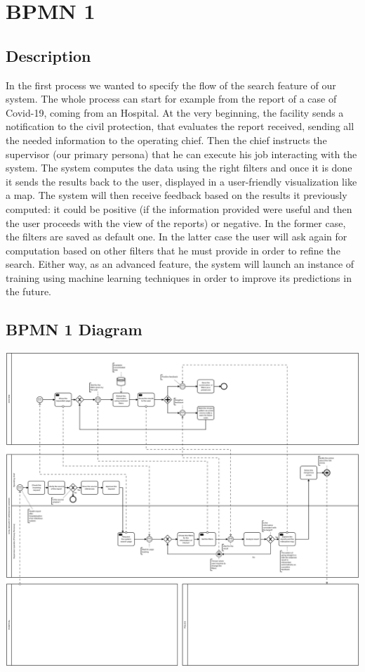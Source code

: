 \documentclass[../main.tex]{subfiles}
\begin{document}
    \chapter{BPMN 1}\label{ch:bpmn-1}
    \section{Description}\label{sec:description2}
    In the first process we wanted to specify the flow of the search feature of our system. The whole process can start for example from the report of a case of Covid-19, coming from an Hospital. At the very beginning, the facility sends a notification to the civil protection, that evaluates the report received, sending all the needed information to the operating chief. Then the chief instructs the supervisor (our primary persona) that he can execute his job interacting with the system. The system computes the data using the right filters and once it is done it sends the results back to the user, displayed in a user-friendly visualization like a map. The system will then receive feedback based on the results it previously computed: it could be positive (if the information provided were useful and then the user proceeds with the view of the reports) or negative. In the former case, the filters are saved as default one. In the latter case the user will ask again for computation based on other filters that he must provide in order to refine the search.
    Either way, as an advanced feature, the system will launch an instance of training using machine learning techniques in order to improve its predictions in the future.

    \section{BPMN 1 Diagram}\label{sec:bpmn-1-diagram}
    \includegraphics[scale = 0.40]{assets/bpmn1.png}
\end{document}
